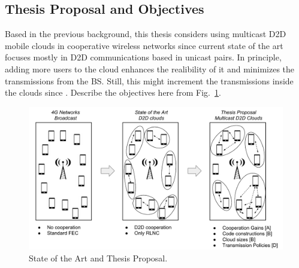 \subsection{Thesis Proposal and Objectives}
Based in the previous background, this thesis considers using multicast \ac{D2D} mobile clouds in cooperative wireless networks since current state of the art focuses mostly in \ac{D2D} communications based in unicast pairs. In principle, adding more users to the cloud enhances the realibility of it and minimizes the transmissions from the \ac{BS}. Still, this might increment the transmissions inside the clouds since . Describe the objectives here from Fig.~\ref{fig:proposal}.

\begin{figure}[ht!]
  \centering 
  \includegraphics[width=\textwidth]{introduction/figures/thesis-diagrams.pdf}
  \caption{State of the Art and Thesis Proposal.}
\label{fig:proposal}
\end{figure} 
